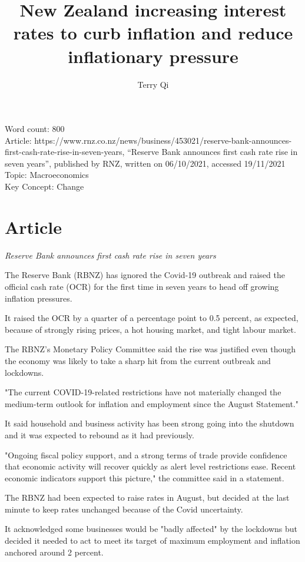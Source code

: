 \documentclass[a4paper,12pt]{article}
\title{New Zealand increasing interest rates to curb inflation and reduce inflationary pressure}
\author{Terry Qi}
\begin{document}
\maketitle

Word count: 800\\
Article: https://www.rnz.co.nz/news/business/453021/reserve-bank-announces-first-cash-rate-rise-in-seven-years, ``Reserve Bank announces first cash rate rise in seven years'', published by RNZ, written on 06/10/2021, accessed 19/11/2021\\
Topic: Macroeconomics\\
Key Concept: Change

\newpage

\section*{Article}

\textit{Reserve Bank announces first cash rate rise in seven years}

The Reserve Bank (RBNZ) has ignored the Covid-19 outbreak and raised the official cash rate (OCR) for the first time in seven years to head off growing inflation pressures.

It raised the OCR by a quarter of a percentage point to 0.5 percent, as expected, because of strongly rising prices, a hot housing market, and tight labour market.

The RBNZ's Monetary Policy Committee said the rise was justified even though the economy was likely to take a sharp hit from the current outbreak and lockdowns.

"The current COVID-19-related restrictions have not materially changed the medium-term outlook for inflation and employment since the August Statement."

It said household and business activity has been strong going into the shutdown and it was expected to rebound as it had previously.

"Ongoing fiscal policy support, and a strong terms of trade provide confidence that economic activity will recover quickly as alert level restrictions ease. Recent economic indicators support this picture," the committee said in a statement.

The RBNZ had been expected to raise rates in August, but decided at the last minute to keep rates unchanged because of the Covid uncertainty.

It acknowledged some businesses would be "badly affected" by the lockdowns but decided it needed to act to meet its target of maximum employment and inflation anchored around 2 percent.
\end{document}

